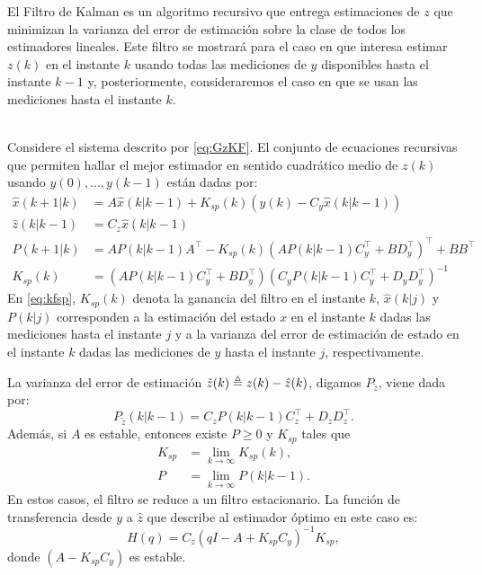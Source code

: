 El Filtro de Kalman es un algoritmo recursivo que entrega estimaciones de $z$ que minimizan la varianza del error de estimaci\'on sobre la clase de todos los estimadores lineales. Este filtro se mostrar\'a para el caso en que interesa estimar $z(k)$ en el instante $k$ usando todas las mediciones de $y$ disponibles hasta el instante $k-1$ y, posteriormente, consideraremos el caso en que se usan las mediciones hasta el instante $k$.

\begin{lema}\label{lema:kfsp}{\ \\}
Considere el sistema descrito por \eqref{eq:GzKF}. El conjunto de ecuaciones recursivas que permiten hallar el mejor estimador en sentido cuadr\'atico medio de $z(k)$ usando $y(0),...,y(k-1)$ est\'an dadas por:
\begin{subequations}\label{eq:kfsp}
\begin{align}
\hat{x}(k+1|k) &= A\hat{x}(k|k-1)+K_{sp}(k)\left(y(k)-C_y\hat{x}(k|k-1)\right)\\
\hat{z}(k|k-1)&=C_z\hat{x}(k|k-1)\\
P(k+1|k)&=AP(k|k-1)A^{\intercal}-K_{sp}(k)\left( AP(k|k-1)C_y^{\intercal}+BD_y^{\intercal}\right)^{\intercal}+BB^{\intercal}\\ \label{eq:Ksp}
K_{sp}(k)&=\left( AP(k|k-1)C_y^{\intercal}+BD_y^{\intercal}\right) \left( C_yP(k|k-1)C_y^{\intercal}+D_yD_y^{\intercal}\right)^{-1}
\end{align}
\end{subequations}
En \eqref{eq:kfsp}, $K_{sp}(k)$ denota la ganancia del filtro en el instante $k$, $\hat{x}(k|j)$ y $P(k|j)$ corresponden a la estimaci\'on del estado $x$ en el instante $k$ dadas las mediciones hasta el instante $j$ y a la varianza del error de estimaci\'on de estado en el instante $k$ dadas las mediciones de $y$ hasta el instante $j$, respectivamente.

La varianza del error de estimaci\'on $\tilde{z}(k)\triangleq z(k)-\hat{z}(k)$, digamos $P_{\tilde{z}}$, viene dada por:
\begin{equation}\label{eq:Pzsp}
P_{\tilde{z}}(k|k-1)=C_zP(k|k-1)C_z^{\intercal}+D_zD_z^{\intercal}.
\end{equation}
Adem\'as, si $A$ es estable, entonces existe $P\geq 0$ y $K_{sp}$ tales que
\begin{align}
K_{sp}&=\lim_{k\rightarrow \infty}{K_{sp}(k)},\\
P&=\lim_{k\rightarrow \infty}{P(k|k-1)}.
\end{align}
En estos casos, el filtro se reduce a un filtro estacionario. La funci\'on de transferencia desde $y$ a $\hat{z}$ que describe al estimador \'optimo en este caso es:
\begin{equation}
H(q)=C_z\left( qI-A+K_{sp}C_y\right)^{-1}K_{sp},
\end{equation}
donde $\left( A-K_{sp}C_y\right)$ es estable.
\QED
\end{lema}

